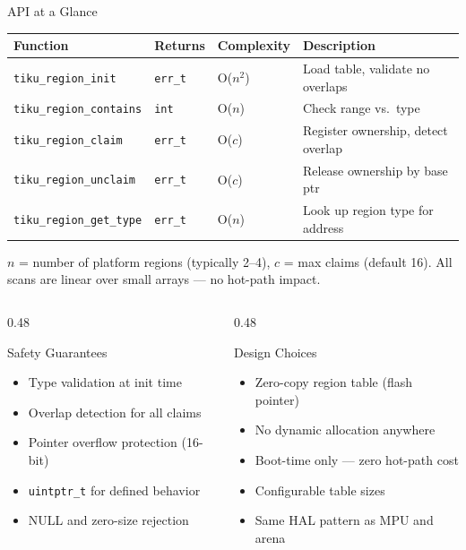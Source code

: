 \documentclass[aspectratio=169, 10pt]{beamer}
\begin{document}
\begin{frame}{API at a Glance}
\begin{table}
\centering
\small
\begin{tabular}{@{}llll@{}}
\toprule
\textbf{Function} & \textbf{Returns} & \textbf{Complexity} & \textbf{Description} \\
\midrule
\texttt{tiku\_region\_init}     & \texttt{err\_t} & O($n^2$) & Load table, validate no overlaps \\
\texttt{tiku\_region\_contains} & \texttt{int}    & O($n$)   & Check range vs.\ type \\
\texttt{tiku\_region\_claim}    & \texttt{err\_t} & O($c$)   & Register ownership, detect overlap \\
\texttt{tiku\_region\_unclaim}  & \texttt{err\_t} & O($c$)   & Release ownership by base ptr \\
\texttt{tiku\_region\_get\_type}& \texttt{err\_t} & O($n$)   & Look up region type for address \\
\bottomrule
\end{tabular}
\end{table}

\vspace{0.3em}
\small $n$ = number of platform regions (typically 2--4), $c$ = max claims (default 16).
All scans are linear over small arrays --- no hot-path impact.

\vspace{0.5em}
\begin{columns}[T]
\begin{column}{0.48\textwidth}
\begin{block}{Safety Guarantees}
\begin{itemize}
  \item Type validation at init time
  \item Overlap detection for all claims
  \item Pointer overflow protection (16-bit)
  \item \texttt{uintptr\_t} for defined behavior
  \item NULL and zero-size rejection
\end{itemize}
\end{block}
\end{column}
\begin{column}{0.48\textwidth}
\begin{block}{Design Choices}
\begin{itemize}
  \item Zero-copy region table (flash pointer)
  \item No dynamic allocation anywhere
  \item Boot-time only --- zero hot-path cost
  \item Configurable table sizes
  \item Same HAL pattern as MPU and arena
\end{itemize}
\end{block}
\end{column}
\end{columns}
\end{frame}
\end{document}
